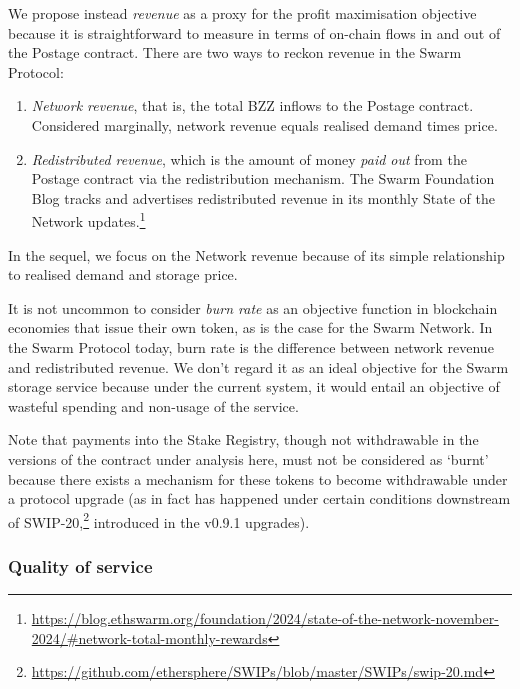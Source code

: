 We propose instead \emph{revenue} as a proxy for the profit maximisation objective because it is straightforward to measure in terms of on-chain flows in and out of the Postage contract.
%
There are two ways to reckon revenue in the Swarm Protocol:
\begin{enumerate}
  \item 
    \emph{Network revenue}, that is, the total BZZ inflows to the Postage contract. 
    Considered marginally, network revenue equals realised demand times price.

  \item 
    \emph{Redistributed revenue}, which is the amount of money \emph{paid out} from the Postage contract via the redistribution mechanism.
    The Swarm Foundation Blog tracks and advertises redistributed revenue in its monthly State of the Network updates.\footnote{\url{https://blog.ethswarm.org/foundation/2024/state-of-the-network-november-2024/\#network-total-monthly-rewards}}

\end{enumerate}
%
In the sequel, we focus on the Network revenue because of its simple relationship to realised demand and storage price.

\begin{remark}

  It is not uncommon to consider \emph{burn rate} as an objective function in blockchain economies that issue their own token, as is the case for the Swarm Network.
  In the Swarm Protocol today, burn rate is the difference between network revenue and redistributed revenue.
  We don't regard it as an ideal objective for the Swarm storage service because under the current system, it would entail an objective of wasteful spending and non-usage of the service.
  
  Note that payments into the Stake Registry, though not withdrawable in the versions of the contract under analysis here, must not be considered as `burnt' because there exists a mechanism for these tokens to become withdrawable under a protocol upgrade (as in fact has happened under certain conditions downstream of SWIP-20,\footnote{\url{https://github.com/ethersphere/SWIPs/blob/master/SWIPs/swip-20.md}} introduced in the v0.9.1 upgrades).

\end{remark}

\subsubsection{Quality of service}

